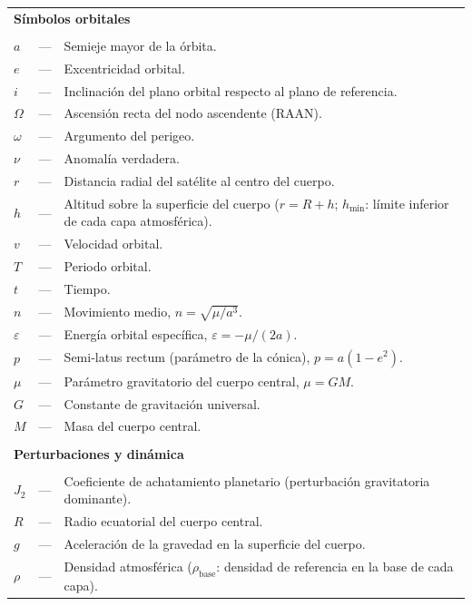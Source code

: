 

\begin{longtable}{lcp{} }
\multicolumn{3}{l}{\textbf{Símbolos orbitales}}\\
\\
$a$ & --- & Semieje mayor de la órbita.\\
$e$ & --- & Excentricidad orbital.\\
$i$ & --- & Inclinación del plano orbital respecto al plano de referencia.\\
$\Omega$ & --- & Ascensión recta del nodo ascendente (RAAN).\\
$\omega$ & --- & Argumento del perigeo.\\
$\nu$ & --- & Anomalía verdadera.\\
$r$ & --- & Distancia radial del satélite al centro del cuerpo.\\
$h$ & --- & Altitud sobre la superficie del cuerpo ($r=R+h$; $h_{\min}$: límite inferior de cada capa atmosférica).\\
$v$ & --- & Velocidad orbital.\\
$T$ & --- & Periodo orbital.\\
$t$ & --- & Tiempo.\\
$n$ & --- & Movimiento medio, $n=\sqrt{\mu/a^3}$.\\
$\varepsilon$ & --- & Energía orbital específica, $\varepsilon=-\mu/(2a)$.\\
$p$ & --- & Semi-latus rectum (parámetro de la cónica), $p=a(1-e^2)$.\\
$\mu$ & --- & Parámetro gravitatorio del cuerpo central, $\mu=GM$.\\
$G$ & --- & Constante de gravitación universal.\\
$M$ & --- & Masa del cuerpo central.\\
\\
\multicolumn{3}{l}{\textbf{Perturbaciones y dinámica}}\\
\\
$J_2$ & --- & Coeficiente de achatamiento planetario (perturbación gravitatoria dominante).\\
$R$ & --- & Radio ecuatorial del cuerpo central.\\
$g$ & --- & Aceleración de la gravedad en la superficie del cuerpo.\\
$\rho$ & --- & Densidad atmosférica ($\rho_{\text{base}}$: densidad de referencia en la base de cada capa).\\

\end{longtable}
